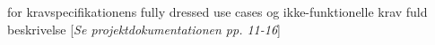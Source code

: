 for kravspecifikationens fully dressed use cases og ikke-funktionelle krav fuld beskrivelse [\textit{Se projektdokumentationen pp. 11-16}]

%
%
%
%
